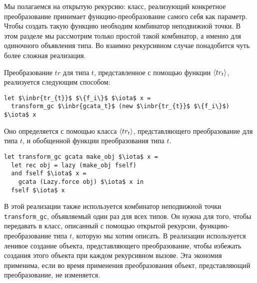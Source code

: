 Мы полагаемся  на открытую рекурсию: класс, реализующий конкретное преобразование принимает функцию-преобразование самого себя как параметр.
Чтобы создать такую функцию необходим комбинатор неподвижной точки. В  этом разделе
мы рассмотрим только простой такой комбинатор, а именно для одиночного объявления типа.
Во взаимно рекурсивном случае понадобится чуть более сложная реализация. %


Преобразование $tr$ для типа $t$, представленное с помощью функции $\left<tr_{t}\right>$, реализуется следующим способом:

\begin{lstlisting}
let $\inbr{tr_{t}}$ $\{f_i\}$ $\iota$ x =
  transform_gc $\inbr{gcata_t}$ (new $\inbr{tr_{t}}$ $\{f_i\}$) $\iota$ x
\end{lstlisting}
\noindent Оно определяется с помощью класса  $\left<tr_{t}\right>$, представляющего преобразование для типа $t$, и обобщенной функции преобразования типа $t$. 

\begin{lstlisting}
let transform_gc gcata make_obj $\iota$ x =
  let rec obj = lazy (make_obj fself)
  and fself $\iota$ x = 
    gcata (Lazy.force obj) $\iota$ x in
  fself $\iota$ x
\end{lstlisting}

\noindent В этой реализации также используется комбинатор неподвижной точки \lstinline|transform_gc|, объявляемый один раз для всех типов. Он нужна для того, чтобы передавать в класс, описанный с помощью открытой рекурсии, функцию-преобразование типа $t$, которую мы хотим описать. В реализации используется ленивое создание объекта, представляющего преобразование, чтобы избежать создания этого объекта при каждом рекурсивном вызове. Эта экономия применима, если во время применения преобразования объект, представляющий преобразование, не изменяется.




